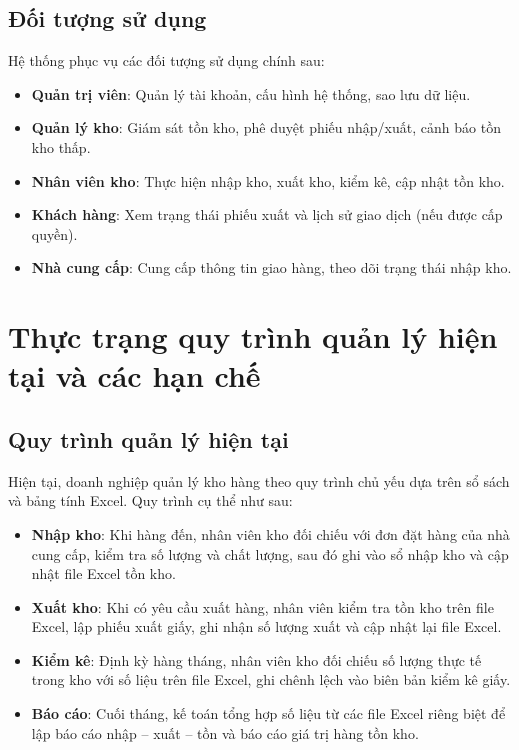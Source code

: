 \subsection{Đối tượng sử dụng}

Hệ thống phục vụ các đối tượng sử dụng chính sau:

\begin{itemize}[leftmargin=1.5cm]
    \item \textbf{Quản trị viên}: Quản lý tài khoản, cấu hình hệ thống, sao lưu dữ liệu.
    \item \textbf{Quản lý kho}: Giám sát tồn kho, phê duyệt phiếu nhập/xuất, cảnh báo tồn kho thấp.
    \item \textbf{Nhân viên kho}: Thực hiện nhập kho, xuất kho, kiểm kê, cập nhật tồn kho.
    \item \textbf{Khách hàng}: Xem trạng thái phiếu xuất và lịch sử giao dịch (nếu được cấp quyền).
    \item \textbf{Nhà cung cấp}: Cung cấp thông tin giao hàng, theo dõi trạng thái nhập kho.
\end{itemize}

\section{Thực trạng quy trình quản lý hiện tại và các hạn chế}

\subsection{Quy trình quản lý hiện tại}

Hiện tại, doanh nghiệp quản lý kho hàng theo quy trình chủ yếu dựa trên sổ sách và bảng tính Excel. Quy trình cụ thể như sau:

\begin{itemize}[leftmargin=1.5cm]
    \item \textbf{Nhập kho}: Khi hàng đến, nhân viên kho đối chiếu với đơn đặt hàng của nhà cung cấp, kiểm tra số lượng và chất lượng, sau đó ghi vào sổ nhập kho và cập nhật file Excel tồn kho.
    \item \textbf{Xuất kho}: Khi có yêu cầu xuất hàng, nhân viên kiểm tra tồn kho trên file Excel, lập phiếu xuất giấy, ghi nhận số lượng xuất và cập nhật lại file Excel.
    \item \textbf{Kiểm kê}: Định kỳ hàng tháng, nhân viên kho đối chiếu số lượng thực tế trong kho với số liệu trên file Excel, ghi chênh lệch vào biên bản kiểm kê giấy.
    \item \textbf{Báo cáo}: Cuối tháng, kế toán tổng hợp số liệu từ các file Excel riêng biệt để lập báo cáo nhập -- xuất -- tồn và báo cáo giá trị hàng tồn kho.
\end{itemize}

